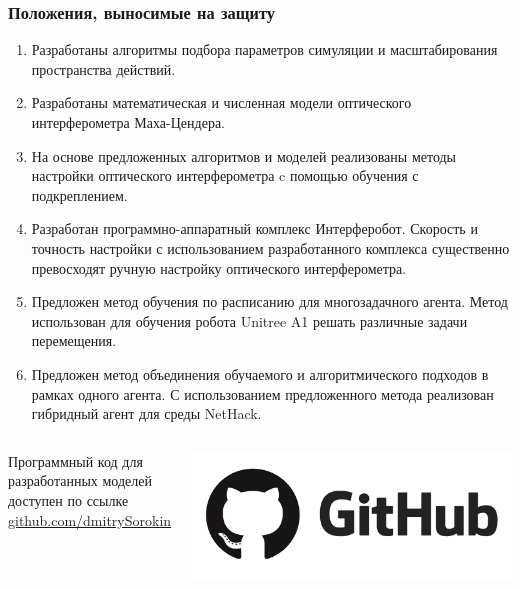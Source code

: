 \begin{frame}[t,allowframebreaks]
\frametitle{Положения, выносимые на защиту}
\begin{enumerate}
\setlength\itemsep{1em}
  \item Разработаны алгоритмы подбора параметров симуляции и масштабирования пространства действий. 
  \item Разработаны математическая и численная модели оптического интерферометра Маха-Цендера. 
  \item На основе предложенных алгоритмов и моделей реализованы методы настройки оптического интерферометра c помощью обучения с подкреплением.
  \item Разработан программно-аппаратный комплекс Интерферобот. Скорость и точность настройки с использованием разработанного комплекса существенно превосходят ручную настройку оптического интерферометра.
  \item Предложен метод обучения по расписанию для многозадачного агента. Метод использован для обучения робота Unitree A1 решать различные задачи перемещения. 
  \item Предложен метод объединения обучаемого и алгоритмического подходов в рамках одного агента. С использованием предложенного метода реализован гибридный агент для среды NetHack.
\end{enumerate}

\vspace{30pt}
\begin{columns}
Программный код для разработанных моделей\\ доступен по ссылке \href{https://github.com/dmitrySorokin}{\color{blue}github.com/dmitrySorokin}

\includegraphics[width=1\linewidth]{Presentation/images/logo/github.png}  

\end{columns}

\end{frame}

